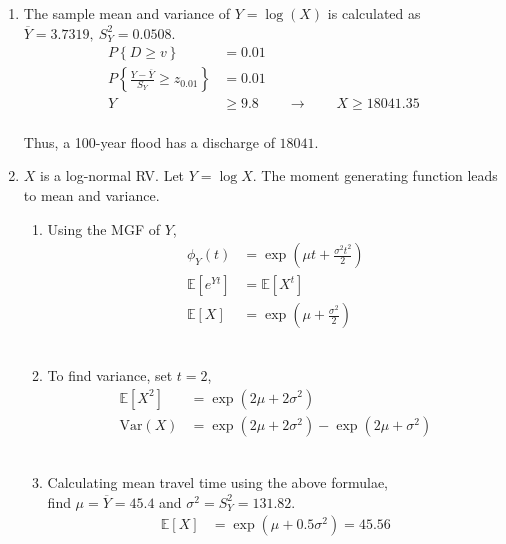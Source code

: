 \begin{enumerate}
	
	\item The sample mean and variance of $ Y = \log(X) $ is calculated as $ \overline{Y} = 3.7319,\ S_Y^2 = 0.0508 $. \\
	
	
		\begin{align}
			P \left\{ D \geq v \right\} &= 0.01 \nonumber \\
			P \left\{ \frac{Y - \overline{Y}}{S_Y} \geq z_{0.01}\right\} &= 0.01 \nonumber \\
			Y &\geq 9.8 \qquad \to \qquad X \geq 18041.35	
		\end{align}\\
	
	
	Thus, a 100-year flood has a discharge of $ 18041 $.
	
	\item $ X $ is a log-normal RV. Let $ Y = \log X $. The moment generating function leads to mean and variance.\\
	
		\begin{enumerate}
			\item Using the MGF of $ Y $, \\
			\begin{align}
				\phi_Y(t) &= \exp \left( \mu t  + \frac{\sigma^2 t^2}{2}\right) \nonumber \\
				\mathbb{E}[e^{Yt}] &= \mathbb{E}[X^t] \nonumber \\
				\mathbb{E}[X] &= \exp \left(\mu + \frac{\sigma^2}{2}\right)
			\end{align} \\
			
			\item To find variance, set $ t = 2 $, \\
			\begin{align}
				\mathbb{E}[X^2] &= \exp \left(2\mu + 2\sigma^2\right) \nonumber \\
				\mathrm{Var}(X) &= \exp \left(2\mu + 2\sigma^2\right) - \exp \left(2\mu + \sigma^2\right)
			\end{align} \\
			
			\item Calculating mean travel time using the above formulae, \\
			find $\mu =  \overline{Y} = 45.4 $ and $ \sigma^2 = S_Y^2 = 131.82 $.\\
			
			\begin{align}
				\mathbb{E}[X] &= \exp \left(\mu + 0.5\sigma^2\right) = 45.56
			\end{align} \\
			

\end{enumerate}
\end{enumerate}
